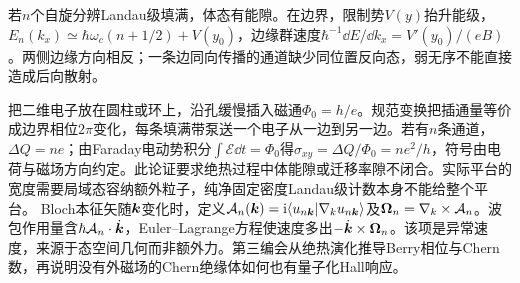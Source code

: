 若$n$个自旋分辨Landau级填满，体态有能隙。在边界，限制势$V(y)$抬升能级，$E_n(k_x)\simeq\hbar\omega_c(n+1/2)+V(y_0)$，边缘群速度$\hbar^{-1}\dd E/\dd k_x=V'(y_0)/(eB)$。两侧边缘方向相反；一条边同向传播的通道缺少同位置反向态，弱无序不能直接造成后向散射。

把二维电子放在圆柱或环上，沿孔缓慢插入磁通$\Phi_0=h/e$。规范变换把插通量等价成边界相位$2\pi$变化，每条填满带泵送一个电子从一边到另一边。若有$n$条通道，$\Delta Q=ne$；由Faraday电动势积分$\int\mathcal E\dd t=\Phi_0$得$\sigma_{xy}=\Delta Q/\Phi_0=ne^2/h$，符号由电荷与磁场方向约定。此论证要求绝热过程中体能隙或迁移率隙不闭合。实际平台的宽度需要局域态容纳额外粒子，纯净固定密度Landau级计数本身不能给整个平台。
Bloch本征矢随$\boldsymbol{k}$变化时，定义$\mathcal A_n(\boldsymbol{k})=\mathrm i\langle u_{n\boldsymbol{k}}|\nabla_k u_{n\boldsymbol{k}}\rangle$及$\boldsymbol{\Omega}_n=\nabla_k\times\mathcal A_n$。波包作用量含$\hbar\mathcal A_n\cdot\dot{\boldsymbol{k}}$，Euler--Lagrange方程使速度多出$-\dot{\boldsymbol{k}}\times\boldsymbol{\Omega}_n$。该项是异常速度，来源于态空间几何而非额外力。第三编会从绝热演化推导Berry相位与Chern数，再说明没有外磁场的Chern绝缘体如何也有量子化Hall响应。

